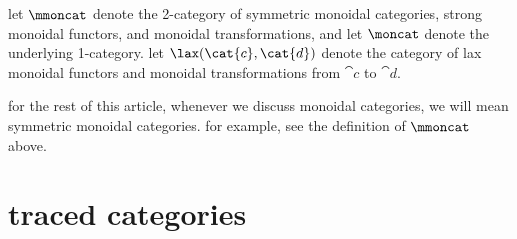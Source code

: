 \documentclass[11pt,oneside,article]{memoir}
\begin{document}
let $\mmoncat$ denote the 2-category of symmetric monoidal categories, strong monoidal functors, and
monoidal transformations, and let $\moncat$ denote the underlying 1-category. let
$\lax(\cat{c},\cat{d})$ denote the category of lax monoidal functors and monoidal transformations
from $\cat{c}$ to $\cat{d}$.

\begin{warning}\label{warn:symmetric}
   for the rest of this article, whenever we discuss monoidal categories, we will mean symmetric
   monoidal categories. for example, see the definition of $\mmoncat$ above.
\end{warning}

\section{traced categories}\label{sec:intuition_for_traced}
\end{document}
